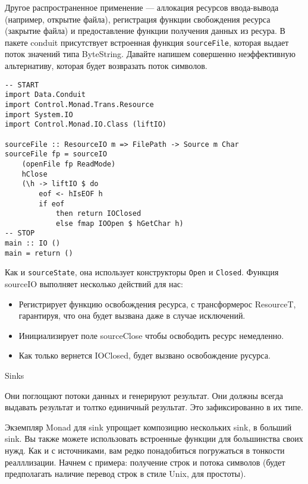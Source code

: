 Другое распространенное применение --- аллокация ресурсов ввода-вывода (например,
открытие файла), регистрация функции свобождения ресурса (закрытие файла) и
предоставление функции получения данных из ресура.
В пакете conduit присутствует встроенная функция \verb=sourceFile=, которая выдает поток
значений типа ByteString. Давайте напишем совершенно неэффективную альтернативу,
которая будет возвразать поток символов.

\begin{lstlisting}
-- START
import Data.Conduit
import Control.Monad.Trans.Resource
import System.IO
import Control.Monad.IO.Class (liftIO)

sourceFile :: ResourceIO m => FilePath -> Source m Char
sourceFile fp = sourceIO
    (openFile fp ReadMode)
    hClose
    (\h -> liftIO $ do
        eof <- hIsEOF h
        if eof
            then return IOClosed
            else fmap IOOpen $ hGetChar h)
-- STOP
main :: IO ()
main = return ()
\end{lstlisting}

Как и \verb=sourceState=, она использует конструкторы \verb*|Open| и \verb*|Closed|.
Функция sourceIO выполняет несколько действий  для нас:
\begin{itemize}
 \item Регистрирует функцию освобождения ресурса, с трансформерос ResourceT,
гарантируя, что она будет вызвана даже в случае исключений.
 \item Инициализирует поле sourceClose чтобы освободить ресурс немедленно.
 \item Как только вернется IOClosed, будет вызвано освобождение русурса.
\end{itemize}
  
Sinks

Они поглощают потоки данных и генерируют результат. Они должны всегда выдавать результат
и толтко единичный результат. Это зафиксированно в их типе.

Экземпляр Monad для sink упрощает композицию нескольких sink, в больший sink. Вы также
можете использовать встроенные функции для большинства своих нужд. Как и с источниками,
вам редко понадобиться погружаться в тонкости реалллизации. Начнем с примера:
получение строк и потока символов (будет предполагать наличие перевод строк в стиле Unix,
для простоты).


